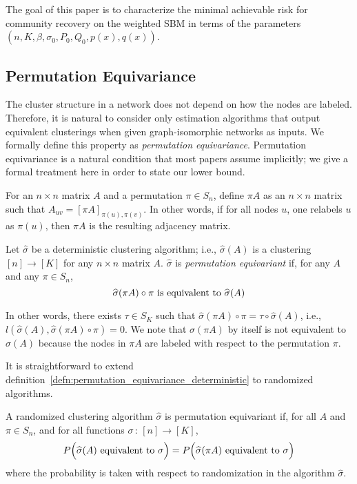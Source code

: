 \documentclass{article}
\begin{document}
The goal of this paper is to characterize the minimal achievable risk for community recovery on the weighted SBM in terms of the parameters $(n, K, \beta, \sigma_0, P_0, Q_0, p(x), q(x))$.


\subsection{Permutation Equivariance}

The cluster structure in a network does not depend on how the nodes are labeled. Therefore, it is natural to consider only estimation algorithms that output equivalent clusterings when given graph-isomorphic networks as inputs. We formally define this property as \emph{permutation equivariance}. Permutation equivariance is a natural condition that most papers assume implicitly; we give a formal treatment here in order to state our lower bound.

\begin{definition}
  \label{defn:permutation_equivariance_deterministic}
  For an $n \times n$ matrix $A$ and a permutation $\pi \in S_n$, define $\pi A$ as an $n \times n$ matrix such that $A_{uv} = [\pi A]_{\pi(u), \pi(v)}$. In other words, if for all nodes $u$, one relabels $u$ as $\pi(u)$, then $\pi A$ is the resulting adjacency matrix. 

  Let $\hat{\sigma}$ be a deterministic clustering algorithm; i.e., $\hat{\sigma}(A)$ is a clustering $[n] \rightarrow [K]$ for any $n \times n$ matrix $A$. $\hat{\sigma}$ is \emph{permutation equivariant} if, for any $A$ and any $\pi \in S_n$,
  \[
    \widehat{\sigma}(\pi A) \circ \pi \textrm{  is equivalent to  } \widehat{\sigma}(A)
  \]
\end{definition}
In other words, there exists $\tau \in S_K$ such that $\hat{\sigma}(\pi A) \circ \pi = \tau \circ \hat{\sigma}(A)$, i.e., $l(\hat{\sigma}(A), \hat{\sigma}(\pi A) \circ \pi) = 0$. We note that $\hat{\sigma}(\pi A)$ by itself is not equivalent to $\hat{\sigma}(A)$ because the nodes in $\pi A$ are labeled with respect to the permutation $\pi$.

It is straightforward to extend definition~\ref{defn:permutation_equivariance_deterministic} to randomized algorithms.
\begin{definition}
  \label{permutation_equivariance_stochastic}
A randomized clustering algorithm $\hat{\sigma}$ is permutation equivariant if, for all $A$ and $\pi \in S_n$, and for all functions $\sigma \,:\, [n] \rightarrow [K]$,
\[
P\Big( \widehat{\sigma}(A) \textrm{ equivalent to }  \sigma \Big) = 
P\Big(  \widehat{\sigma}(\pi A) \textrm{ equivalent to } \sigma \Big)
\]
where the probability is taken with respect to randomization in the algorithm $\hat{\sigma}$.
\end{definition}
\end{document}
